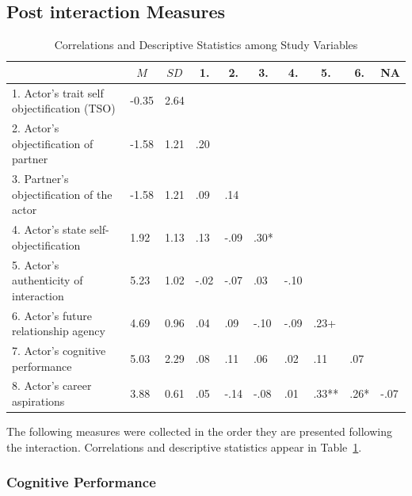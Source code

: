 \documentclass[man]{apa6}
\begin{document}
\subsection{Post interaction Measures}\label{post-interaction-measures}

\begin{table}[tbp]
\begin{center}
\begin{threeparttable}
\caption{\label{tab:corrtable}Correlations and Descriptive Statistics among Study Variables}
\begin{tabular}{llllllllll}
\toprule
 & \multicolumn{1}{c}{$M$} & \multicolumn{1}{c}{$SD$} & \multicolumn{1}{c}{1.} & \multicolumn{1}{c}{2.} & \multicolumn{1}{c}{3.} & \multicolumn{1}{c}{4.} & \multicolumn{1}{c}{5.} & \multicolumn{1}{c}{6.} & \multicolumn{1}{c}{NA}\\
\midrule
1. Actor's trait self objectification (TSO) & -0.35 & 2.64 &  &  &  &  &  &  & \\
2. Actor's objectification of partner & -1.58 & 1.21 & .20 &  &  &  &  &  & \\
3. Partner's objectification of the actor & -1.58 & 1.21 & .09 & .14 &  &  &  &  & \\
4. Actor's state self-objectification & 1.92 & 1.13 & .13 & -.09 & .30* &  &  &  & \\
5. Actor's authenticity of interaction & 5.23 & 1.02 & -.02 & -.07 & .03 & -.10 &  &  & \\
6. Actor's future relationship agency & 4.69 & 0.96 & .04 & .09 & -.10 & -.09 & .23+ &  & \\
7. Actor's cognitive performance & 5.03 & 2.29 & .08 & .11 & .06 & .02 & .11 & .07 & \\
8. Actor's career aspirations & 3.88 & 0.61 & .05 & -.14 & -.08 & .01 & .33** & .26* & -.07\\
\bottomrule
\end{tabular}
\end{threeparttable}
\end{center}
\end{table}

The following measures were collected in the order they are presented
following the interaction. Correlations and descriptive statistics
appear in Table~\ref{tab:corrtable}.

\subsubsection{Cognitive Performance}\label{cognitive-performance}
\end{document}

